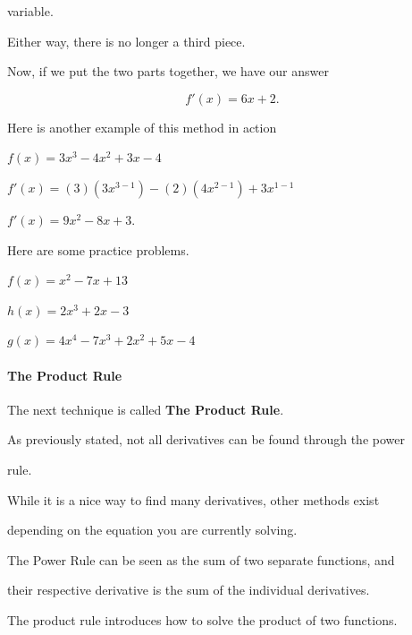 {{{{variable.



Either way, there is no longer a third piece.



Now, if we put the two parts together, we have our answer



$$f'(x) = 6x + 2.$$



Here is another example of this method in action



$f(x) = 3x^3 - 4x^2 + 3x - 4$



$f'(x) = (3)(3x^{3-1}) - (2)(4x^{2-1}) + 3x^{1-1}$



$f'(x) = 9x^2 - 8x + 3.$



Here are some practice problems.



$f(x) = x^2 - 7x + 13$



$h(x) = 2x^3 + 2x - 3$



$g(x) = 4x^4 - 7x^3 + 2x^2 + 5x - 4$



\paragraph{The Product Rule}



The next technique is called \textbf{The Product Rule}.



As previously stated, not all derivatives can be found through the power

rule.



While it is a nice way to find many derivatives, other methods exist

depending on the equation you are currently solving.



The Power Rule can be seen as the sum of two separate functions, and

their respective derivative is the sum of the individual derivatives.



The product rule introduces how to solve the product of two functions.



}}}}
